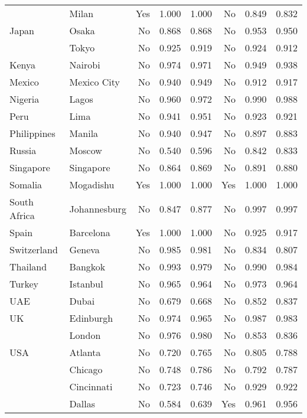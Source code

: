 \begin{tabular}{ l l r r r r r r  }
	& Milan &      Yes &  1.000 &  1.000 &       No &  0.849 &  0.832 \\
	Japan & Osaka &       No &  0.868 &  0.868 &       No &  0.953 &  0.950 \\
	& Tokyo &       No &  0.925 &  0.919 &       No &  0.924 &  0.912 \\
	Kenya & Nairobi &       No &  0.974 &  0.971 &       No &  0.949 &  0.938 \\
	Mexico & Mexico City &       No &  0.940 &  0.949 &       No &  0.912 &  0.917 \\
	Nigeria & Lagos &       No &  0.960 &  0.972 &       No &  0.990 &  0.988 \\
	Peru & Lima &       No &  0.941 &  0.951 &       No &  0.923 &  0.921 \\
	Philippines & Manila &       No &  0.940 &  0.947 &       No &  0.897 &  0.883 \\
	Russia & Moscow &       No &  0.540 &  0.596 &       No &  0.842 &  0.833 \\
	Singapore & Singapore &       No &  0.864 &  0.869 &       No &  0.891 &  0.880 \\
	Somalia & Mogadishu &      Yes &  1.000 &  1.000 &      Yes &  1.000 &  1.000 \\
	South Africa & Johannesburg &       No &  0.847 &  0.877 &       No &  0.997 &  0.997 \\
	Spain & Barcelona &      Yes &  1.000 &  1.000 &       No &  0.925 &  0.917 \\
	Switzerland & Geneva &       No &  0.985 &  0.981 &       No &  0.834 &  0.807 \\
	Thailand & Bangkok &       No &  0.993 &  0.979 &       No &  0.990 &  0.984 \\
	Turkey & Istanbul &       No &  0.965 &  0.964 &       No &  0.973 &  0.964 \\
	UAE & Dubai &       No &  0.679 &  0.668 &       No &  0.852 &  0.837 \\
	UK & Edinburgh &       No &  0.974 &  0.965 &       No &  0.987 &  0.983 \\
	& London &       No &  0.976 &  0.980 &       No &  0.853 &  0.836 \\
	USA & Atlanta &       No &  0.720 &  0.765 &       No &  0.805 &  0.788 \\
	& Chicago &       No &  0.748 &  0.786 &       No &  0.792 &  0.787 \\
	& Cincinnati &       No &  0.723 &  0.746 &       No &  0.929 &  0.922 \\
	& Dallas &       No &  0.584 &  0.639 &      Yes &  0.961 &  0.956 \\

\end{tabular}
